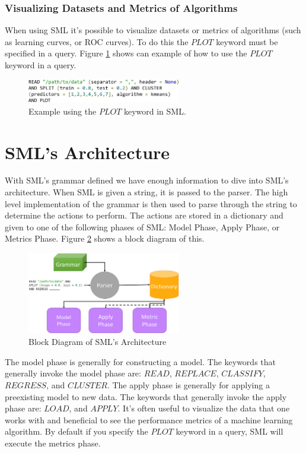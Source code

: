 \documentclass[jair,twoside,11pt,theapa]{article}
\begin{document}
\subsubsection{Visualizing Datasets and Metrics of Algorithms}
When using SML it's possible to visualize datasets or metrics of algorithms (such as learning curves, or ROC curves). To do this the \(PLOT\) keyword must be specified in a query. Figure \ref{fig:SML:PLOT} shows can example of how to use the \(PLOT\) keyword in a query.

\begin{figure}
\includegraphics[width=0.6\textwidth]{figs/PLOT.png}
\centering
\caption{Example using the \(PLOT\) keyword in SML.}
\label{fig:SML:PLOT}
\end{figure}

\section{SML's Architecture}
\label{sml-architecture}

With SML's grammar defined we have enough information to dive into SML's architecture. When SML is given a string, it is passed to the parser. The high level implementation of the grammar is then used to parse through the string to determine the actions to perform. The actions are stored in a dictionary and given to one of the following phases of SML: Model Phase, Apply Phase, or Metrics Phase. Figure \ref{fig:SML:Architecture} shows a block diagram of this.

\begin{figure}
\includegraphics[width=0.6\textwidth]{figs/architecture.png}
\centering
\caption{Block Diagram of SML's Architecture}
\label{fig:SML:Architecture}
\end{figure}

The model phase is generally for constructing a model. The keywords that generally invoke the model phase are: \(READ\), \(REPLACE\), \(CLASSIFY\), \(REGRESS\), and \(CLUSTER\). The apply phase is generally for applying a preexisting model  to new data. The keywords that generally invoke the apply phase are: \(LOAD\), and \(APPLY\). It's often useful to visualize the data that one works with and beneficial to see the performance metrics of a machine learning algorithm. By default if you specify the \(PLOT\) keyword in a query, SML will execute the metrics phase.
\end{document}
